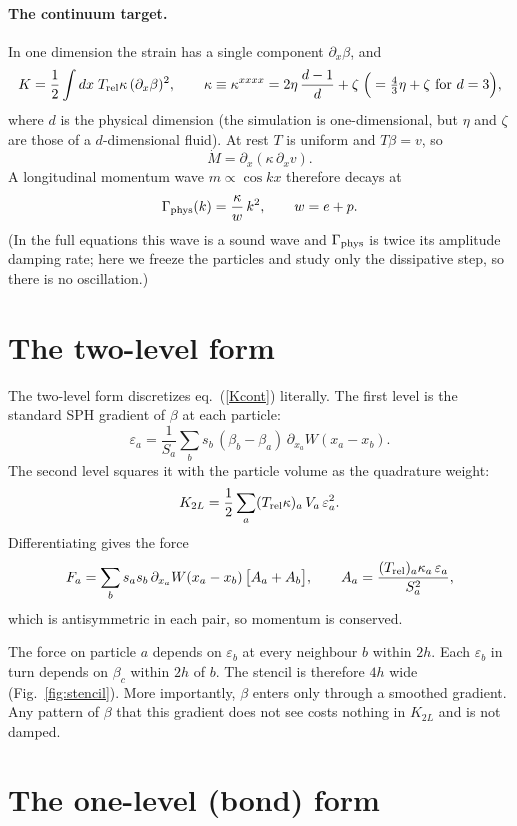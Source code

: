 \documentclass[11pt,aps,preprint,nofootinbib,superscriptaddress,tightenlines]{revtex4-2}
\def\st{\begin{equation}}
\def\stp{\end{equation}}
\def\Eq#1{eq.~(\ref{#1})}
\def\Fig#1{Fig.~\ref{#1}}
\let\oldparagraph\paragraph
\renewcommand{\paragraph}{\par\bigskip\oldparagraph}
\begin{document}
\paragraph{The continuum target.}
In one dimension the strain has a single component $\partial_x\beta$, and
\st
K=\frac12\int dx\;T_{\rm rel}\kappa\,(\partial_x\beta)^2,\qquad
\kappa\equiv\kappa^{xxxx}=2\eta\,\frac{d-1}{d}+\zeta
\;\Big(=\tfrac43\eta+\zeta\text{ for } d=3\Big),
\label{Kcont}
\stp
where $d$ is the physical dimension (the simulation is one-dimensional, but
$\eta$ and $\zeta$ are those of a $d$-dimensional fluid).  At rest $T$ is
uniform and $T\beta=v$, so
\st
\dot M=\partial_x(\kappa\,\partial_xv) .
\stp
A longitudinal momentum wave $m\propto\cos kx$ therefore decays at
\st
\Gamma_{\rm phys}(k)=\frac{\kappa}{w}\,k^2,\qquad w=e+p .
\label{Gphys}
\stp
(In the full equations this wave is a sound wave and $\Gamma_{\rm phys}$ is
twice its amplitude damping rate; here we freeze the particles and
study only the dissipative step, so there is no oscillation.)

\section{The two-level form}
\label{sec:twolevel}

The two-level form discretizes \Eq{Kcont} literally.  The first level is
the standard SPH gradient of $\beta$ at each particle:
\st
\varepsilon_a=\frac{1}{S_a}\sum_b s_b\,(\beta_b-\beta_a)\,
\partial_{x_a}W(x_a-x_b) .
\label{eps}
\stp
The second level squares it with the particle volume as the quadrature weight:
\st
K_{2L}=\frac12\sum_a(T_{\rm rel}\kappa)_a\,V_a\,\varepsilon_a^2 .
\label{K2L}
\stp
Differentiating gives the force
\st
F_a=\sum_bs_as_b\,\partial_{x_a}W(x_a-x_b)\,\big[A_a+A_b\big],\qquad
A_a=\frac{(T_{\rm rel})_a\kappa_a\,\varepsilon_a}{S_a^2},
\label{f2L}
\stp
which is antisymmetric in each pair, so momentum is conserved.

The force on particle $a$ depends on $\varepsilon_b$ at every neighbour $b$
within $2h$.  Each $\varepsilon_b$ in turn depends on $\beta_c$ within $2h$ of
$b$.  The stencil is therefore $4h$ wide (\Fig{fig:stencil}).  More
importantly, $\beta$ enters only through a smoothed gradient.  Any pattern of
$\beta$ that this gradient does not see costs nothing in $K_{2L}$ and is not
damped.

\section{The one-level (bond) form}
\label{sec:onelevel}
\end{document}
